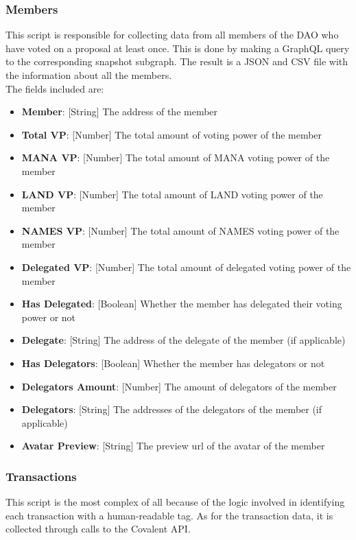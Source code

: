 \documentclass[MSE,Master,english]{twbook}%
\begin{document}
\subsubsection{Members}
This script is responsible for collecting data from all members of the DAO who have voted on a proposal at least once. This is done by making a GraphQL query to the corresponding snapshot subgraph. The result is a JSON and CSV file with the information about all the members. \\

The fields included are:
\begin{itemize}
  \item \textbf{Member}: [String] The address of the member
  \item \textbf{Total VP}: [Number] The total amount of voting power of the member
  \item \textbf{MANA VP}: [Number] The total amount of MANA voting power of the member
  \item \textbf{LAND VP}: [Number] The total amount of LAND voting power of the member
  \item \textbf{NAMES VP}: [Number] The total amount of NAMES voting power of the member
  \item \textbf{Delegated VP}: [Number] The total amount of delegated voting power of the member
  \item \textbf{Has Delegated}: [Boolean] Whether the member has delegated their voting power or not
  \item \textbf{Delegate}: [String] The address of the delegate of the member (if applicable)
  \item \textbf{Has Delegators}: [Boolean] Whether the member has delegators or not
  \item \textbf{Delegators Amount}: [Number] The amount of delegators of the member
  \item \textbf{Delegators}: [String] The addresses of the delegators of the member (if applicable)
  \item \textbf{Avatar Preview}: [String] The preview url of the avatar of the member
\end{itemize}

\subsubsection{Transactions}
This script is the most complex of all because of the logic involved in identifying each transaction with a human-readable tag. As for the transaction data, it is collected through calls to the Covalent API.
\end{document}
